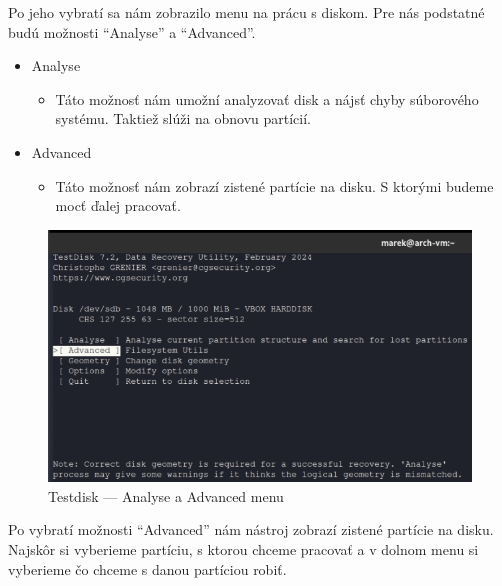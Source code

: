 \documentclass[12pt,oneside,slovak,a4paper]{article}
\begin{document}
Po jeho vybratí sa nám zobrazilo menu na prácu s diskom. Pre nás podstatné budú možnosti ``Analyse'' a ``Advanced''.

\begin{spacing}{1.0}
	\begin{itemize}
		\item Analyse
			\begin{itemize}
				\item Táto možnosť nám umožní analyzovať disk a nájsť chyby súborového systému. Taktiež slúži na obnovu partícií.
			\end{itemize}
		\item Advanced
			\begin{itemize}
				\item Táto možnosť nám zobrazí zistené partície na disku. S ktorými budeme mocť ďalej pracovať.
			\end{itemize}
	\end{itemize}
\end{spacing}

\begin{figure}[H]
	\centering
	\includegraphics[scale=0.8]{./images/testdisk_testing/testdisk_analyse_advanced.png}
	\centering
	\captionsetup{justification=centering,margin=2cm}
	\caption{Testdisk --- Analyse a Advanced menu}
\end{figure}

Po vybratí možnosti ``Advanced'' nám nástroj zobrazí zistené partície na disku. Najskôr si vyberieme partíciu, s ktorou chceme pracovať a v dolnom menu si vyberieme čo chceme s danou partíciou robiť.
\end{document}
